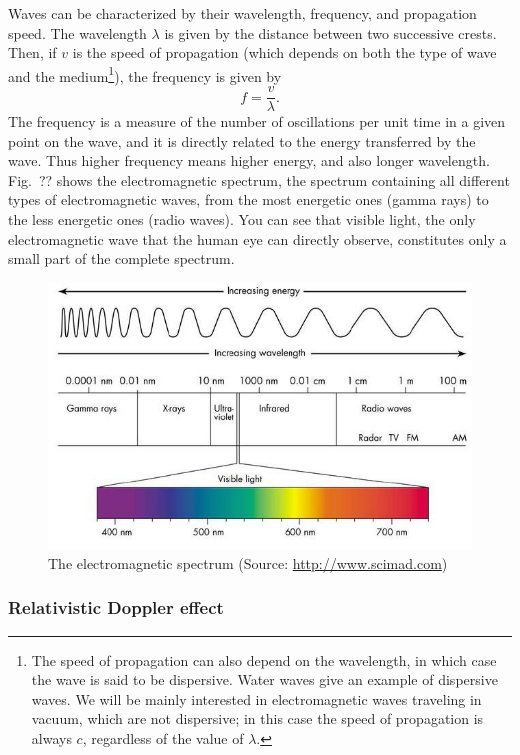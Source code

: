 \documentclass[11pt, a4paper,oneside,openright]{book}
\numberwithin{equation}{section}
\begin{document}
Waves can be characterized by their wavelength, frequency, and propagation speed. The wavelength $\lambda$ is given by the distance between two successive crests. Then, if $v$ is the speed of propagation (which depends on both the type of wave and the medium\footnote{The speed of propagation can also depend on the wavelength, in which case the wave is said to be dispersive. Water waves give an example of dispersive waves. We will be mainly interested in electromagnetic waves traveling in vacuum, which are not dispersive; in this case the speed of propagation is always $c$, regardless of the value of $\lambda$.}), the frequency is given by
\begin{equation}
f=\frac{v}{\lambda}.
\end{equation}
The frequency is a measure of the number of oscillations per unit time in a given point on the wave, and it is directly related to the energy transferred by the wave. Thus higher frequency means higher energy, and also longer wavelength. Fig.\ ?? shows the electromagnetic spectrum, the spectrum containing all different types of electromagnetic waves, from the most energetic ones (gamma rays) to the less energetic ones (radio waves). You can see that visible light, the only electromagnetic wave that the human eye can directly observe, constitutes only a small part of the complete spectrum.
\begin{figure}[ht]
\begin{center}
\includegraphics[scale=2]{Draw/lec4_6.png}
\end{center}
\caption{The electromagnetic spectrum (Source: \url{http://www.scimad.com})}
\label{fig:lec4_6}
\end{figure}

\subsubsection{Relativistic Doppler effect}
\end{document}
